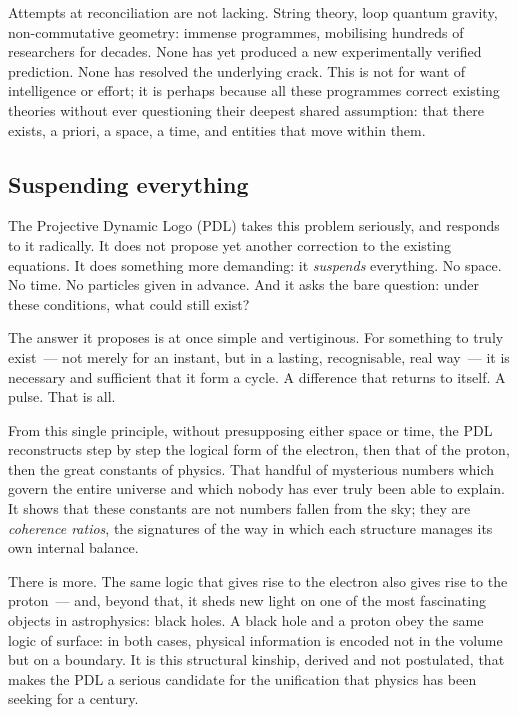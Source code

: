 \documentclass[12pt, a4paper, openright]{book}
\begin{document}
\medskip

Attempts at reconciliation are not lacking. String theory, loop quantum gravity, non-commutative geometry: immense programmes, mobilising hundreds of researchers for decades. None has yet produced a new experimentally verified prediction. None has resolved the underlying crack. This is not for want of intelligence or effort; it is perhaps because all these programmes correct existing theories without ever questioning their deepest shared assumption: that there exists, a priori, a space, a time, and entities that move within them.

\subsection*{Suspending everything}

The Projective Dynamic Logo (PDL) takes this problem seriously, and responds to it radically. It does not propose yet another correction to the existing equations. It does something more demanding: it \emph{suspends} everything. No space. No time. No particles given in advance. And it asks the bare question: under these conditions, what could still exist?

\medskip

The answer it proposes is at once simple and vertiginous. For something to truly exist~--- not merely for an instant, but in a lasting, recognisable, real way~--- it is necessary and sufficient that it form a cycle. A difference that returns to itself. A pulse. That is all.

\medskip

From this single principle, without presupposing either space or time, the PDL reconstructs step by step the logical form of the electron, then that of the proton, then the great constants of physics. That handful of mysterious numbers which govern the entire universe and which nobody has ever truly been able to explain. It shows that these constants are not numbers fallen from the sky; they are \emph{coherence ratios}, the signatures of the way in which each structure manages its own internal balance.

\medskip

There is more. The same logic that gives rise to the electron also gives rise to the proton~--- and, beyond that, it sheds new light on one of the most fascinating objects in astrophysics: black holes. A black hole and a proton obey the same logic of surface: in both cases, physical information is encoded not in the volume but on a boundary. It is this structural kinship, derived and not postulated, that makes the PDL a serious candidate for the unification that physics has been seeking for a century. 
\end{document}
